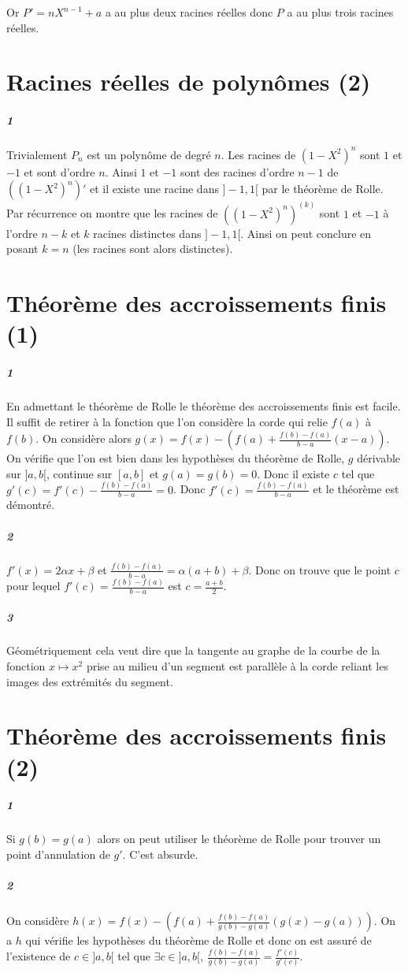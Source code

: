 \documentclass[10pt,a4paper]{article}
\begin{document}
Or $P' = nX^{n-1} +a$ a au plus deux racines réelles donc $P$ a au plus trois racines réelles.

\section{Racines réelles de polynômes (2)}
\subparagraph{1}Trivialement $P_n$ est un polynôme de degré $n$. Les racines de $(1-X^2)^n$ sont $1$ et $-1$ et sont d'ordre $n$. Ainsi $1$ et $-1$ sont des racines d'ordre $n-1$ de $\left((1-X^2)^n\right)'$ et il existe une racine dans $]-1,1[$ par le théorème de Rolle. Par récurrence on montre que les racines de $\left((1-X^2)^n \right)^{(k)}$ sont $1$ et $-1$ à l'ordre $n-k$ et $k$ racines distinctes dans $]-1,1[$. Ainsi on peut conclure en posant $k=n$ (les racines sont alors distinctes).

\section{Théorème des accroissements finis (1)}
\subparagraph{1}En admettant le théorème de Rolle le théorème des accroissements finis est facile. Il suffit de retirer à la fonction que l'on considère la corde qui relie $f(a)$ à $f(b)$. On considère alors $g(x) = f(x) - (f(a) + \frac{f(b) -f(a)}{b-a}(x-a))$. On vérifie que l'on est bien dans les hypothèses du théorème de Rolle, $g$ dérivable sur $]a,b[$, continue sur $[a,b]$ et $g(a) = g(b) = 0$. Donc il existe $c$ tel que $g'(c) = f'(c) - \frac{f(b)-f(a)}{b-a} = 0$. Donc $f'(c) = \frac{f(b) - f(a)}{b-a}$ et le théorème est démontré.

\subparagraph{2} $f'(x) = 2\alpha x+\beta$ et $\frac{f(b)-f(a)}{b-a} = \alpha(a+b) + \beta$. Donc on trouve que le point $c$ pour lequel $f'(c) = \frac{f(b) - f(a)}{b-a}$ est $c = \frac{a+b}{2}$.
\subparagraph{3}Géométriquement cela veut dire que la tangente au graphe de la courbe de la fonction $x \mapsto x^2$ prise au milieu d'un segment est parallèle à la corde reliant les images des extrémités du segment.

\section{Théorème des accroissements finis (2)}

\subparagraph{1}Si $g(b) = g(a)$ alors on peut utiliser le théorème de Rolle pour trouver un point d'annulation de $g'$. C'est absurde.

\subparagraph{2}On considère $h(x) = f(x) - (f(a) + \frac{f(b) -f(a)}{g(b)-g(a)}(g(x)-g(a)))$. On a $h$ qui vérifie les hypothèses du théorème de Rolle et donc on est assuré de l'existence de $c \in ]a,b[$ tel que $\exists c \in ]a,b[, \ \frac{f(b)-f(a)}{g(b)-g(a)}=\frac{f'(c)}{g'(c)}$.
\end{document}
